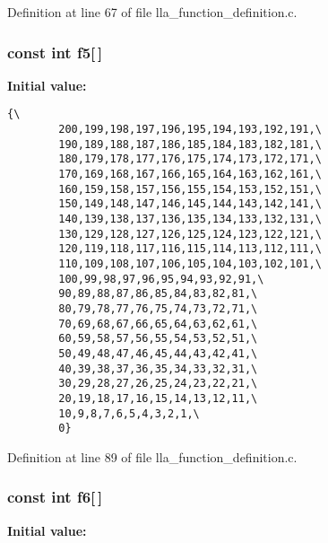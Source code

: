 Definition at line 67 of file lla\_\-function\_\-definition.c.
\subsubsection{\setlength{\rightskip}{0pt plus 5cm}const int {\bf f5}[$\,$]}\label{lla__function__definition_8c_a4}


{\bf Initial value:}

\footnotesize\begin{verbatim}{\
        200,199,198,197,196,195,194,193,192,191,\
        190,189,188,187,186,185,184,183,182,181,\
        180,179,178,177,176,175,174,173,172,171,\
        170,169,168,167,166,165,164,163,162,161,\
        160,159,158,157,156,155,154,153,152,151,\
        150,149,148,147,146,145,144,143,142,141,\
        140,139,138,137,136,135,134,133,132,131,\
        130,129,128,127,126,125,124,123,122,121,\
        120,119,118,117,116,115,114,113,112,111,\
        110,109,108,107,106,105,104,103,102,101,\
        100,99,98,97,96,95,94,93,92,91,\
        90,89,88,87,86,85,84,83,82,81,\
        80,79,78,77,76,75,74,73,72,71,\
        70,69,68,67,66,65,64,63,62,61,\
        60,59,58,57,56,55,54,53,52,51,\
        50,49,48,47,46,45,44,43,42,41,\
        40,39,38,37,36,35,34,33,32,31,\
        30,29,28,27,26,25,24,23,22,21,\
        20,19,18,17,16,15,14,13,12,11,\
        10,9,8,7,6,5,4,3,2,1,\
        0}
\end{verbatim}\normalsize 


Definition at line 89 of file lla\_\-function\_\-definition.c.
\subsubsection{\setlength{\rightskip}{0pt plus 5cm}const int {\bf f6}[$\,$]}\label{lla__function__definition_8c_a5}


{\bf Initial value:}

